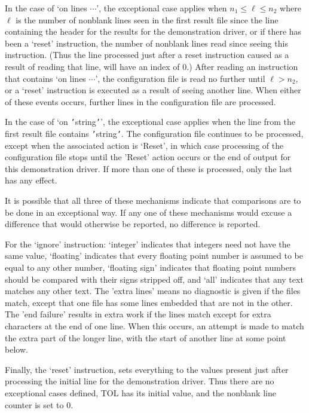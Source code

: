 \documentclass[twoside]{MATH77}
\begin{document}
In the case of `on lines $\cdots$', the exceptional case applies when
$n_1 \leq \ell \leq n_2$ where $\ell$ is the number of nonblank lines seen
in the first result file since the line containing the header for the
results for the demonstration driver, or if there has been a `reset'
instruction, the number of nonblank lines read since seeing this instruction.
(Thus the line processed just after a reset instruction caused as a result
of reading that line, will have an index of 0.) After reading an
instruction that contains `on lines $\cdots$', the configuration file is
read no further until $\ell > n_2$, or a `reset' instruction is executed
as a result of seeing another line.  When either of these events occurs,
further lines in the configuration file are processed.

In the case of `on {\tt '}string{\tt '}', the exceptional case applies
when the line from the first result file contains {\tt '}string{\tt '}.
The configuration file continues to be processed, except when the
associated action is `Reset', in which case processing of the
configuration file stops until the 'Reset' action occurs or the end of
output for this demonstration driver.  If more than one of these is
processed, only the last has any effect.

It is possible that all three of these mechanisms indicate that
comparisons are to be done in an exceptional way.  If any one of these
mechanisms would excuse a difference that would otherwise be reported, no
difference is reported.

For the `ignore' instruction: `integer' indicates that integers need not have
the same value, `floating' indicates that every floating point number is
assumed to be equal to any other number, `floating sign' indicates that
floating point numbers should be compared with their signs stripped off, and
`all' indicates that any text matches any other text.  The 'extra lines' means
no diagnostic is given if the files match, except that one file has some lines
embedded that are not in the other.  The 'end failure' results in extra work
if the lines match except for extra characters at the end of one line.  When
this occurs, an attempt is made to match the extra part of the longer line,
with the start of another line at some point below.

Finally, the `reset' instruction, sets everything to the values present
just after processing the initial line for the demonstration driver.  Thus
there are no exceptional cases defined, TOL has its initial value, and the
nonblank line counter is set to 0.
\end{document}
